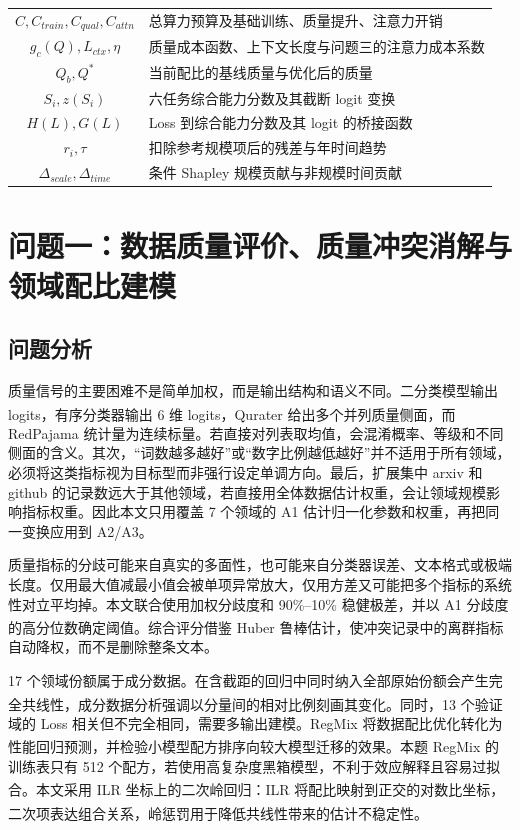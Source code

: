 \documentclass[bwprint]{gmcmthesis}
\numberwithin{equation}{section}
\numberwithin{figure}{section}
\numberwithin{table}{section}
\begin{document}
\begin{xltabular}{0.92\textwidth}{cX}
    $C,C_{train},C_{qual},C_{attn}$ & 总算力预算及基础训练、质量提升、注意力开销 \\
    $g_c(Q),L_{ctx},\eta$ & 质量成本函数、上下文长度与问题三的注意力成本系数 \\
    $Q_b,Q^*$ & 当前配比的基线质量与优化后的质量 \\
    $S_i,z(S_i)$ & 六任务综合能力分数及其截断 logit 变换 \\
    $H(L),G(L)$ & Loss 到综合能力分数及其 logit 的桥接函数 \\
    $r_i,\tau$ & 扣除参考规模项后的残差与年时间趋势 \\
    $\Delta_{scale},\Delta_{time}$ & 条件 Shapley 规模贡献与非规模时间贡献 \\
\end{xltabular}



\section{问题一：数据质量评价、质量冲突消解与领域配比建模}   %
    \subsection{问题分析}   %
    质量信号的主要困难不是简单加权，而是输出结构和语义不同。二分类模型输出 logits，有序分类器输出 6 维 logits，Qurater 给出多个并列质量侧面\textsuperscript{\cite{wettig2024qurating}}，而 RedPajama 统计量为连续标量。若直接对列表取均值，会混淆概率、等级和不同侧面的含义。其次，``词数越多越好''或``数字比例越低越好''并不适用于所有领域，必须将这类指标视为目标型而非强行设定单调方向。最后，扩展集中 arxiv 和 github 的记录数远大于其他领域，若直接用全体数据估计权重，会让领域规模影响指标权重。因此本文只用覆盖 7 个领域的 A1 估计归一化参数和权重，再把同一变换应用到 A2/A3。

    质量指标的分歧可能来自真实的多面性，也可能来自分类器误差、文本格式或极端长度。仅用最大值减最小值会被单项异常放大，仅用方差又可能把多个指标的系统性对立平均掉。本文联合使用加权分歧度和 90\%--10\% 稳健极差，并以 A1 分歧度的高分位数确定阈值。综合评分借鉴 Huber 鲁棒估计\textsuperscript{\cite{huber1964robust}}，使冲突记录中的离群指标自动降权，而不是删除整条文本。

    17 个领域份额属于成分数据。在含截距的回归中同时纳入全部原始份额会产生完全共线性，成分数据分析强调以分量间的相对比例刻画其变化\textsuperscript{\cite{aitchison1982compositional}}。同时，13 个验证域的 Loss 相关但不完全相同，需要多输出建模。RegMix 将数据配比优化转化为性能回归预测，并检验小模型配方排序向较大模型迁移的效果\textsuperscript{\cite{liu2025regmix}}。本题 RegMix 的训练表只有 512 个配方，若使用高复杂度黑箱模型，不利于效应解释且容易过拟合。本文采用 ILR 坐标上的二次岭回归：ILR 将配比映射到正交的对数比坐标\textsuperscript{\cite{egozcue2003ilr}}，二次项表达组合关系，岭惩罚用于降低共线性带来的估计不稳定性\textsuperscript{\cite{hoerl1970ridge}}。
\end{document}
